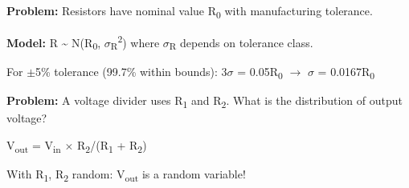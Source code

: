 

\textbf{Problem:} Resistors have nominal value R\textsubscript{0} with manufacturing tolerance.

\textbf{Model:} R \textasciitilde{} N(R\textsubscript{0}, \ensuremath{\sigma}\textsubscript{R}\textsuperscript{2}) where \ensuremath{\sigma}\textsubscript{R} depends on tolerance class.

For \ensuremath{\pm}5\% tolerance (99.7\% within bounds): 3\ensuremath{\sigma} = 0.05R\textsubscript{0} \ensuremath{\to} \ensuremath{\sigma} = 0.0167R\textsubscript{0}


\textbf{Problem:} A voltage divider uses R\textsubscript{1} and R\textsubscript{2}. What is the distribution of output voltage?

V\textsubscript{out} = V\textsubscript{in} \ensuremath{\times} R\textsubscript{2}/(R\textsubscript{1} + R\textsubscript{2})

With R\textsubscript{1}, R\textsubscript{2} random: V\textsubscript{out} is a random variable!



